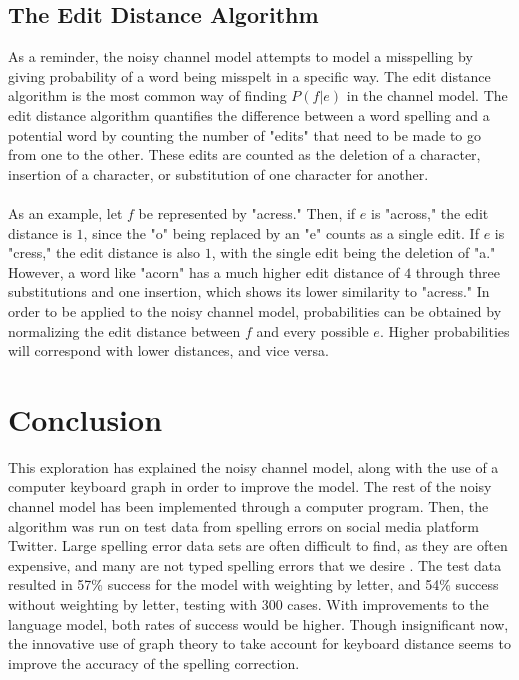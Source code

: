 \documentclass[12pt]{article}
\numberwithin{equation}{section}
\begin{document}
\subsection{The Edit Distance Algorithm}
As a reminder, the noisy channel model attempts to model a misspelling by giving probability of a word being misspelt in a specific way. The edit distance algorithm is the most common way of finding $P(f|e)$ in the channel model. The edit distance algorithm quantifies the difference between a word spelling and a potential word by counting the number of "edits" that need to be made to go from one to the other. These edits are counted as the deletion of a character, insertion of a character, or substitution of one character for another.
\\\\
As an example, let $f$ be represented by "acress." Then, if $e$ is "across," the edit distance is $1$, since the "o" being replaced by an "e" counts as a single edit. If $e$ is "cress," the edit distance is also $1$, with the single edit being the deletion of "a." However, a word like "acorn" has a much higher edit distance of $4$ through three substitutions and one insertion, which shows its lower similarity to "acress."
\cite{brill_moore_2000}
In order to be applied to the noisy channel model, probabilities can be obtained by normalizing the edit distance between $f$ and every possible $e$. Higher probabilities will correspond with lower distances, and vice versa.

\section{Conclusion}
This exploration has explained the noisy channel model, along with the use of a computer keyboard graph in order to improve the model. The rest of the noisy channel model has been implemented through a computer program. Then, the algorithm was run on test data from spelling errors on social media platform Twitter. Large spelling error data sets are often difficult to find, as they are often expensive, and many are not typed spelling errors that we desire \cite{hagiwara-mita-2020-github}. The test data resulted in 57\% success for the model with weighting by letter, and 54\% success without weighting by letter, testing with 300 cases. With improvements to the language model, both rates of success would be higher. Though insignificant now, the innovative use of graph theory to take account for keyboard distance seems to improve the accuracy of the spelling correction.
\end{document}
